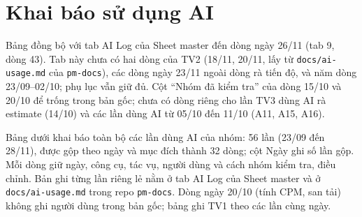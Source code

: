 \chapter{Khai báo sử dụng AI}
\label{app:ai-declaration}

Bảng đồng bộ với tab AI Log của Sheet master đến dòng ngày 26/11 (tab 9, dòng 43). Tab này chưa có hai dòng của TV2 (18/11, 20/11, lấy từ \texttt{docs/\allowbreak ai-usage.md} của \texttt{pm-docs}), các dòng ngày 23/11 ngoài dòng rà tiến độ, và năm dòng 23/09--02/10; phụ lục vẫn giữ đủ. Cột \enquote{Nhóm đã kiểm tra} của dòng 15/10 và 20/10 để trống trong bản gốc; chưa có dòng riêng cho lần TV3 dùng AI rà estimate (14/10) và các lần dùng AI từ 05/10 đến 11/10 (A11, A15, A16).

Bảng dưới khai báo toàn bộ các lần dùng AI của nhóm: 56 lần (23/09 đến 28/11), được gộp theo ngày và mục đích thành 32 dòng; cột Ngày ghi số lần gộp. Mỗi dòng giữ ngày, công cụ, tác vụ, người dùng và cách nhóm kiểm tra, điều chỉnh. Bản ghi từng lần riêng lẻ nằm ở tab AI Log của Sheet master và ở \texttt{docs/\allowbreak ai-usage.md} trong repo \texttt{pm-docs}. Dòng ngày 20/10 (tính CPM, san tải) không ghi người dùng trong bản gốc; bảng ghi TV1 theo các lần cùng ngày.

